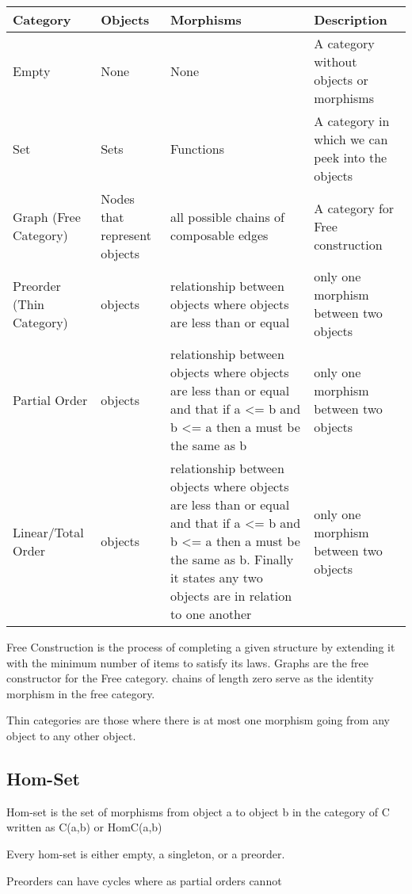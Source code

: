 \documentclass[12pt, letterpaper]{article}
\begin{document}
\begin{tabularx}{1\textwidth} { 
  | >{\centering\arraybackslash}X 
  | >{\centering\arraybackslash}X 
  | >{\centering\arraybackslash}X 
  | >{\centering\arraybackslash}X | }
\hline
Category & Objects & Morphisms & Description \\
\hline
Empty & None & None & A category without objects or morphisms \\
\hline
Set & Sets & Functions & A category in which we can peek into the objects \\
\hline
Graph (Free Category) & Nodes that represent objects & all possible chains of composable edges & A category for Free construction \\ 
\hline
Preorder (Thin Category) & objects & relationship between objects where objects are less than or equal & only one morphism between two objects \\
\hline
Partial Order & objects & relationship between objects where objects are less than or equal and that if a <= b and b <= a then a must be the same as b & only one morphism between two objects \\
\hline
Linear/Total Order & objects & relationship between objects where objects are less than or equal and that if a <= b and b <= a then a must be the same as b. Finally it states any two objects are in relation to one another & only one morphism between two objects \\
\hline
\end{tabularx}

\hfill\break
Free Construction is the process of completing a given structure by extending it with the minimum number of items to satisfy its laws. Graphs are the free constructor for the Free category. chains of length zero serve as the identity morphism in the free category.

Thin categories are those where there is at most one morphism going from any object to any other object.

\subsection {Hom-Set}

Hom-set is the set of morphisms from object a to object b in the category of C written as C(a,b) or HomC(a,b)

Every hom-set is either empty, a singleton, or a preorder. 

Preorders can have cycles where as partial orders cannot
\end{document}
